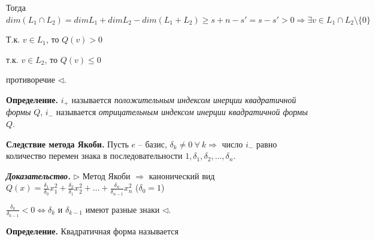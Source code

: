 Тогда $dim(L_1 \cap L_2) = dimL_1 + dimL_2 - dim(L_1 + L_2) \geq s + n - s' = s - s'> 0 \Rightarrow \exists v \in L_1 \cap L_2 \setminus \{0\} $

Т.к. $v \in L_1$, то $Q(v) > 0$

т.к. $v \in L_2$, то $Q(v) \leq 0$

противоречие $\lhd$.

\vspace{\baselineskip}
\textbf{Определение.} $i_+$ называется \textit{положительным индексом инерции квадратичной формы} $Q$, $i_-$ называется \textit{отрицательным индексом инерции квадратичной формы} $Q$.

\vspace{\baselineskip}
\textbf{Следствие метода Якоби.} Пусть $e$ -- базис, $\delta_k \neq 0 \ \forall \ k \Rightarrow$ число $i_-$ равно количество перемен знака в последовательности $1, \delta_1, \delta_2, \dots, \delta_n$.

\vspace{\baselineskip}
\textbf{\textit{Доказательство.}} $\rhd$ Метод Якоби $\Rightarrow$ канонический вид $Q(x) = \frac{\delta_1}{\delta_0} x_1^2 + \frac{\delta_2}{\delta_1} x_2^2 + \dots + \frac{\delta_n}{\delta_{n-1}} x_n^2$ ($\delta_0 = 1$)

$\frac{\delta_k}{\delta_{k-1}} < 0 \Leftrightarrow \delta_k$ и $\delta_{k-1}$ имеют разные знаки $\lhd$.

\vspace{\baselineskip}
\textbf{Определение.} Квадратичная форма называется 

